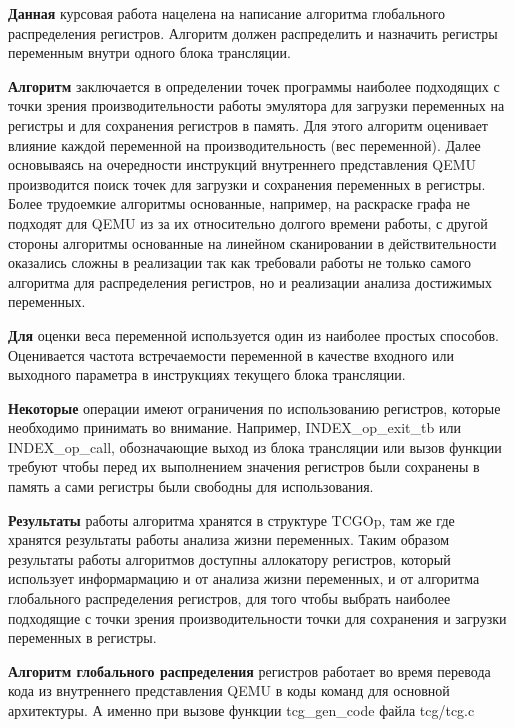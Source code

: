 \textbf{Данная}
курсовая работа нацелена на написание алгоритма глобального распределения регистров. Алгоритм должен распределить и назначить регистры переменным внутри одного блока трансляции.
 
\textbf{Алгоритм}
заключается в определении точек программы наиболее подходящих с точки зрения производительности работы эмулятора для загрузки переменных на регистры и для сохранения регистров в память. Для этого алгоритм оценивает влияние каждой переменной на производительность (вес переменной). Далее основываясь на очередности инструкций внутреннего представления QEMU производится поиск точек для загрузки и сохранения переменных в регистры. Более трудоемкие алгоритмы основанные, например, на раскраске графа не подходят для QEMU из за их относительно долгого времени работы, с другой стороны алгоритмы основанные на линейном сканировании в действительности оказались сложны в реализации так как требовали работы не только самого алгоритма для распределения регистров, но и реализации анализа достижимых переменных.

\textbf{Для}
оценки веса переменной используется один из наиболее простых способов. Оценивается частота встречаемости переменной в качестве входного или выходного параметра в инструкциях текущего блока трансляции.

\textbf{Некоторые}
операции имеют ограничения по использованию регистров, которые необходимо принимать во внимание. Например, INDEX\_op\_exit\_tb или INDEX\_op\_call, обозначающие выход из блока трансляции или вызов функции требуют чтобы перед их выполнением значения регистров были сохранены в память а сами регистры были свободны для использования.

\textbf{Результаты}
работы алгоритма хранятся в структуре TCGOp, там же где хранятся результаты работы анализа жизни переменных. Таким образом результаты работы алгоритмов доступны аллокатору регистров, который использует информармацию и от анализа жизни переменных, и от алгоритма глобального распределения регистров, для того чтобы выбрать наиболее 
подходящие с точки зрения производительности точки для сохранения и загрузки переменных в регистры.

\textbf{Алгоритм глобального распределения}
регистров работает во время перевода кода из внутреннего представления QEMU в коды команд для основной архитектуры. А именно при вызове функции tcg\_gen\_code файла tcg/tcg.c

